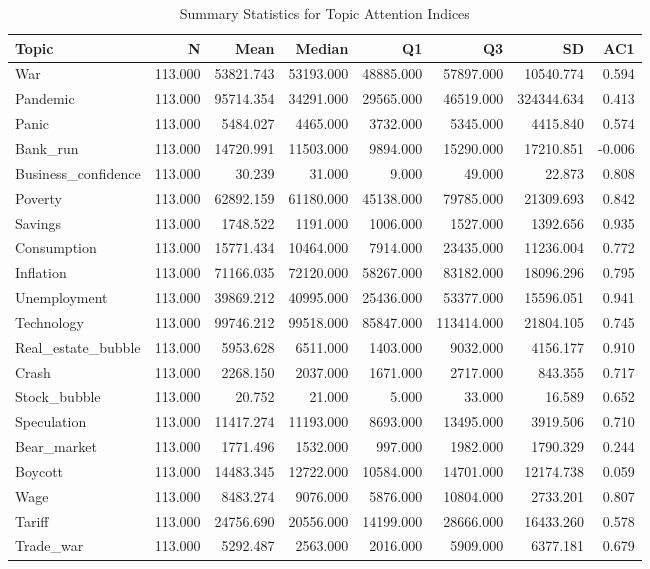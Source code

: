 \begin{table}[ht]
\centering
\begin{tabular}{lrrrrrrr}
  \hline
Topic & N & Mean & Median & Q1 & Q3 & SD & AC1 \\ 
  \hline
War & 113.000 & 53821.743 & 53193.000 & 48885.000 & 57897.000 & 10540.774 & 0.594 \\ 
  Pandemic & 113.000 & 95714.354 & 34291.000 & 29565.000 & 46519.000 & 324344.634 & 0.413 \\ 
  Panic & 113.000 & 5484.027 & 4465.000 & 3732.000 & 5345.000 & 4415.840 & 0.574 \\ 
  Bank\_run & 113.000 & 14720.991 & 11503.000 & 9894.000 & 15290.000 & 17210.851 & -0.006 \\ 
  Business\_confidence & 113.000 & 30.239 & 31.000 & 9.000 & 49.000 & 22.873 & 0.808 \\ 
  Poverty & 113.000 & 62892.159 & 61180.000 & 45138.000 & 79785.000 & 21309.693 & 0.842 \\ 
  Savings & 113.000 & 1748.522 & 1191.000 & 1006.000 & 1527.000 & 1392.656 & 0.935 \\ 
  Consumption & 113.000 & 15771.434 & 10464.000 & 7914.000 & 23435.000 & 11236.004 & 0.772 \\ 
  Inflation & 113.000 & 71166.035 & 72120.000 & 58267.000 & 83182.000 & 18096.296 & 0.795 \\ 
  Unemployment & 113.000 & 39869.212 & 40995.000 & 25436.000 & 53377.000 & 15596.051 & 0.941 \\ 
  Technology & 113.000 & 99746.212 & 99518.000 & 85847.000 & 113414.000 & 21804.105 & 0.745 \\ 
  Real\_estate\_bubble & 113.000 & 5953.628 & 6511.000 & 1403.000 & 9032.000 & 4156.177 & 0.910 \\ 
  Crash & 113.000 & 2268.150 & 2037.000 & 1671.000 & 2717.000 & 843.355 & 0.717 \\ 
  Stock\_bubble & 113.000 & 20.752 & 21.000 & 5.000 & 33.000 & 16.589 & 0.652 \\ 
  Speculation & 113.000 & 11417.274 & 11193.000 & 8693.000 & 13495.000 & 3919.506 & 0.710 \\ 
  Bear\_market & 113.000 & 1771.496 & 1532.000 & 997.000 & 1982.000 & 1790.329 & 0.244 \\ 
  Boycott & 113.000 & 14483.345 & 12722.000 & 10584.000 & 14701.000 & 12174.738 & 0.059 \\ 
  Wage & 113.000 & 8483.274 & 9076.000 & 5876.000 & 10804.000 & 2733.201 & 0.807 \\ 
  Tariff & 113.000 & 24756.690 & 20556.000 & 14199.000 & 28666.000 & 16433.260 & 0.578 \\ 
  Trade\_war & 113.000 & 5292.487 & 2563.000 & 2016.000 & 5909.000 & 6377.181 & 0.679 \\ 
   \hline
\end{tabular}
\caption{Summary Statistics for Topic Attention Indices} 
\label{tab:topic_summary}
\end{table}
